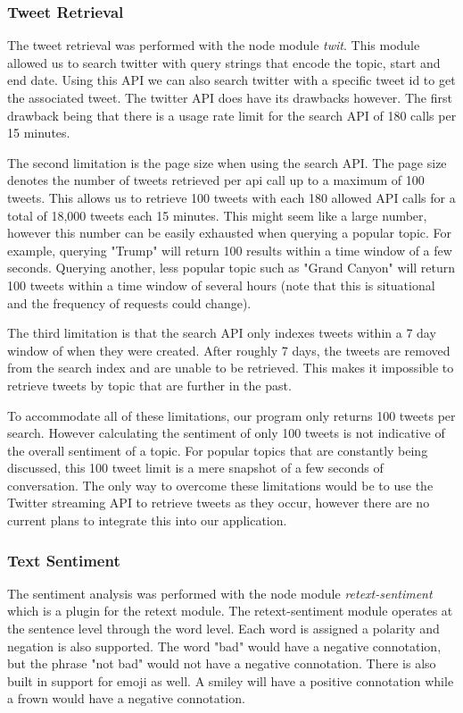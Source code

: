\subsubsection{Tweet Retrieval}
The tweet retrieval was performed with the node module {\em twit}. This module allowed us to search twitter with query strings that encode the topic, start and end date. Using this API we can also search twitter with a specific tweet id to get the associated tweet. The twitter API does have its drawbacks however. The first drawback being that there is a usage rate limit for the search API of 180 calls per 15 minutes. 

The second limitation is the page size when using the search API. The page size denotes the number of tweets retrieved per api call up to a maximum of 100 tweets. This allows us to retrieve 100 tweets with each 180 allowed API calls for a total of 18,000 tweets each 15 minutes. This might seem like a large number, however this number can be easily exhausted when querying a popular topic. For example, querying "Trump" will return 100 results within a time window of a few seconds. Querying another, less popular topic such as "Grand Canyon" will return 100 tweets within a time window of several hours (note that this is situational and the frequency of requests could change).

The third limitation is that the search API only indexes tweets within a 7 day window of when they were created. After roughly 7 days, the tweets are removed from the search index and are unable to be retrieved. This makes it impossible to retrieve tweets by topic that are further in the past.

To accommodate all of these limitations, our program only returns 100 tweets per search. However calculating the sentiment of only 100 tweets is not indicative of the overall sentiment of a topic. For popular topics that are constantly being discussed, this 100 tweet limit is a mere snapshot of a few seconds of conversation. The only way to overcome these limitations would be to use the Twitter streaming API to retrieve tweets as they occur, however there are no current plans to integrate this into our application.

\subsubsection{Text Sentiment}
The sentiment analysis was performed with the node module {\em retext-sentiment} which is a plugin for the retext module. The retext-sentiment module operates at the sentence level through the word level. Each word is assigned a polarity and negation is also supported. The word "bad" would have a negative connotation, but the phrase "not bad" would not have a negative connotation. There is also built in support for emoji as well. A smiley will have a positive connotation while a frown would have a negative connotation. 

